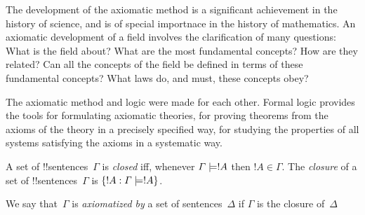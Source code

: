 \documentclass[../../include/open-logic-section]{subfiles}
\begin{document}

\begin{explain}
The development of the axiomatic method is a significant achievement
in the history of science, and is of special importnace in the history
of mathematics.  An axiomatic development of a field involves the
clarification of many questions: What is the field about?  What are the
most fundamental concepts?  How are they related?  Can all the
concepts of the field be defined in terms of these fundamental
concepts?  What laws do, and must, these concepts obey?

The axiomatic method and logic were made for each other.  Formal logic
provides the tools for formulating axiomatic theories, for proving
theorems from the axioms of the theory in a precisely specified way,
for studying the properties of all systems satisfying the axioms in a
systematic way.
\end{explain}

\begin{defn}
A set of !!{sentence}s~$\Gamma$ is \emph{closed} iff, whenever
$\Gamma \Entails !A$ then $!A \in \Gamma$.  The \emph{closure} of a set
of !!{sentence}s~$\Gamma$ is $\Setabs{!A}{\Gamma \Entails !A}$.

We say that~$\Gamma$ is \emph{axiomatized by} a set of
sentences~$\Delta$ if $\Gamma$ is the closure of~$\Delta$
\end{defn}
\end{document}
